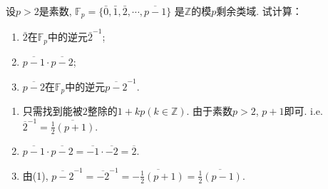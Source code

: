 \begin{problem}
    设$p > 2$是素数,
$\mathbb{F}_p = \{\bar{0}, \bar{1}, \bar{2}, \cdots, \overline{p-1}\}$
是$\mathbb{Z}$的模$p$剩余类域. 试计算：
\begin{enumerate}[(1)]
    \item $\bar{2}$在$\mathbb{F}_p$中的逆元$\bar{2}^{-1}$;
    \item $\overline{p - 1} \cdot \overline{p - 2}$;
    \item $\overline{p - 2}$在$\mathbb{F}_p$中的逆元$\overline{p-2}^{-1}$.
\end{enumerate}
\end{problem}

\begin{solution}
\begin{enumerate}[(1)]
    \item 只需找到能被$2$整除的$1 + kp(k \in \mathbb{Z})$.
由于素数$p > 2$, $p + 1$即可. i.e. $\overline{2}^{-1} = \overline{\frac12(p + 1)}$.
    \item $\overline{p - 1} \cdot \overline{p - 2} = \overline{-1} \cdot \overline{-2} = \overline{2}$.
    \item 由(1), $\overline{p - 2}^{-1} = \overline{-2}^{-1} = \overline{-\frac12(p + 1)} = \overline{\frac12(p - 1)}$.
\end{enumerate}
\end{solution}
    